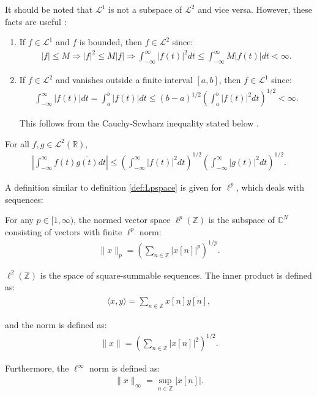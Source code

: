 It should be noted that $\mathcal{L}^1$ is not a subspace of $\mathcal{L}^2$ and vice versa. However, these facts are useful \cite{page 205, FAA}:
\begin{enumerate}
\item If $f \in \mathcal{L}^1$ and $f$ is bounded, then $f \in \mathcal{L}^2$ since:
\begin{align*}
|f| \leq M \Rightarrow |f|^2 \leq M|f| \Rightarrow \int_{-\infty}^\infty |f(t)|^2 dt \leq \int_{-\infty}^\infty M|f(t)| dt < \infty.
\end{align*}

\item If $f \in \mathcal{L}^2$ and vanishes outside a finite interval $[a,b]$, then $f \in \mathcal{L}^1$ since:
\begin{align*}
\int_{-\infty}^\infty |f(t)| dt = \int_a^b |f(t)| dt \leq (b - a)^{1/2} \left( \int_a^b |f(t)|^2 dt \right)^{1/2} < \infty.
\end{align*}

This follows from the Cauchy-Scwharz inequality stated below \cite{page 118, FSE2010}.
\end{enumerate}

\begin{theorem}
For all $f,g \in \mathcal{L}^2(\mathbb{R})$,
\begin{align*}
\left| \int_{-\infty}^\infty f(t) \overline{g(t)} dt \right| \leq \left( \int_{-\infty}^\infty |f(t)|^2 dt \right)^{1/2} \left( \int_{-\infty}^\infty |g(t)|^2 dt \right)^{1/2}.
\end{align*}
\end{theorem}

A definition similar to definition \ref{def:Lpspace} is given for $\ell^p$, which deals with sequences:
\begin{definition}
For any $p \in [1,\infty)$, the normed vector space $\ell^p(\mathbb{Z})$ is the subspace of $\mathbb{C}^N$ consisting of vectors with finite $\ell^p$ norm:
\begin{align*}
\|x\|_p = \left( \sum_{n\in\mathbb{Z}} |x[n]|^p \right)^{1/p}.
\end{align*}

$\ell^2(\mathbb{Z})$ is the space of square-summable sequences. The inner product is defined as:
\begin{align*}
\langle x,y \rangle = \sum_{n\in\mathbb{Z}} x[n] \overline{y[n]},
\end{align*}

and the norm is defined as:
\begin{align*}
\|x\| = \left( \sum_{n\in\mathbb{Z}} |x[n]|^2 \right)^{1/2}.
\end{align*}

Furthermore, the $\ell^\infty$ norm is defined as:
\begin{align*}
\|x\|_\infty = \sup_{n\in\mathbb{Z}}|x[n]|.
\end{align*}
\end{definition}